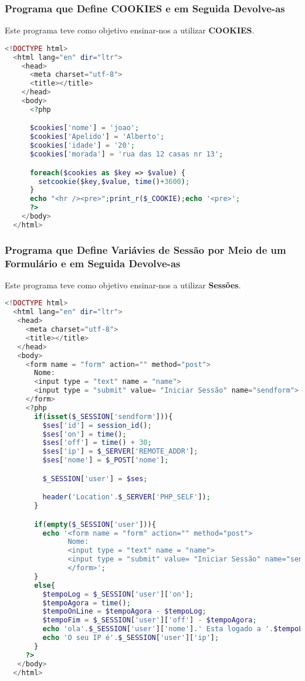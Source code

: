 \documentclass[14pt]{article}
\begin{document}
\subsubsection{Programa que Define COOKIES e em Seguida Devolve-as}

Este programa teve como objetivo ensinar-nos a utilizar \textbf{COOKIES}.

\begin{lstlisting}[language=PHP]
  <!DOCTYPE html>
  <html lang="en" dir="ltr">
    <head>
      <meta charset="utf-8">
      <title></title>
    </head>
    <body>
      <?php

      $cookies['nome'] = 'joao';
      $cookies['Apelido'] = 'Alberto';
      $cookies['idade'] = '20';
      $cookies['morada'] = 'rua das 12 casas nr 13';

      foreach($cookies as $key => $value) {
        setcookie($key,$value, time()+3600);
      }
      echo "<hr /><pre>";print_r($_COOKIE);echo '<pre>';
      ?>
    </body>
  </html>

\end{lstlisting}

\subsubsection{Programa que Define Variávies de Sessão por Meio de um Formulário e em Seguida Devolve-as}

Este programa teve como objetivo ensinar-nos a utilizar \textbf{Sessões}.

\begin{lstlisting}[language=PHP]
  <!DOCTYPE html>
  <html lang="en" dir="ltr">
   <head>
     <meta charset="utf-8">
     <title></title>
   </head>
   <body>
     <form name = "form" action="" method="post">
       Nome:
       <input type = "text" name = "name">
       <input type = "submit" value= "Iniciar Sessão" name="sendform">
     </form>
     <?php
       if(isset($_SESSION['sendform'])){
         $ses['id'] = session_id();
         $ses['on'] = time();
         $ses['off'] = time() + 30;
         $ses['ip'] = $_SERVER['REMOTE_ADDR'];
         $ses['nome'] = $_POST['nome'];

         $_SESSION['user'] = $ses;

         header('Location'.$_SERVER['PHP_SELF']);
       }

       if(empty($_SESSION['user'])){
         echo '<form name = "form" action="" method="post">
               Nome:
               <input type = "text" name = "name">
               <input type = "submit" value= "Iniciar Sessão" name="sendform">
               </form>';
       }
       else{
         $tempoLog = $_SESSION['user']['on'];
         $tempoAgora = time();
         $tempoOnLine = $tempoAgora - $tempoLog;
         $tempoFim = $_SESSION['user']['off'] - $tempoAgora;
         echo 'ola'.$_SESSION['user']['nome'].' Esta logado a '.$tempoLog.'segundos';
         echo 'O seu IP é'.$_SESSION['user']['ip'];
       }
     ?>
   </body>
  </html>
\end{lstlisting}
\end{document}
